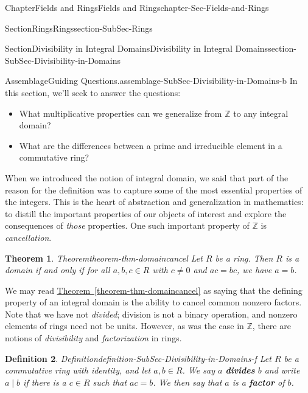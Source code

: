 \documentclass[oneside,10pt,]{book}
\newcommand{\xreffont}{\relax}
\newcommand{\terminology}[1]{\textbf{#1}}
\numberwithin{equation}{section}
\def\Z{{\mathbb Z}}
\newtheorem{theorem}{Theorem}[section]
\newtheorem{definition}[theorem]{Definition}
\begin{document}
\begin{chapterptx}{Chapter}{Fields and Rings}{}{Fields and Rings}{}{}{chapter-Sec-Fields-and-Rings}
\begin{sectionptx}{Section}{Rings}{}{Rings}{}{}{section-SubSec-Rings}
\end{sectionptx}
%
%
\typeout{************************************************}
\typeout{************************************************}
%
\begin{sectionptx}{Section}{Divisibility in Integral Domains}{}{Divisibility in Integral Domains}{}{}{section-SubSec-Divisibility-in-Domains}
\begin{assemblage}{Assemblage}{Guiding Questions.}{assemblage-SubSec-Divisibility-in-Domains-b}%
In this section, we'll seek to answer the questions: %
\begin{itemize}[label=\textbullet]
\item{}What multiplicative properties can we generalize from \(\Z\) to any integral domain?%
\item{}What are the differences between a prime and irreducible element in a commutative ring?%
\end{itemize}
%
\end{assemblage}
When we introduced the notion of integral domain, we said that part of the reason for the definition was to capture some of the most essential properties of the integers. This is the heart of abstraction and generalization in mathematics: to distill the important properties of our objects of interest and explore the consequences of \emph{those} properties. One such important property of \(\Z\) is \emph{cancellation}.%
\begin{theorem}{Theorem}{}{}{theorem-thm-domaincancel}%
Let \(R\) be a ring. Then \(R\) is a domain if and only if for all \(a,b,c\in R\) with \(c\ne 0\) and \(ac = bc\), we have \(a = b\).%
\end{theorem}
We may read \hyperref[theorem-thm-domaincancel]{Theorem~{\xreffont\ref{theorem-thm-domaincancel}}} as saying that the defining property of an integral domain is the ability to cancel common nonzero factors. Note that we have not \emph{divided}; division is not a binary operation, and nonzero elements of rings need not be units. However, as was the case in \(\Z\), there are notions of \emph{divisibility} and \emph{factorization} in rings.%
\begin{definition}{Definition}{}{definition-SubSec-Divisibility-in-Domains-f}%
%
%
Let \(R\) be a commutative ring with identity, and let \(a,b\in R\). We say \(a\) \terminology{divides} \(b\) and write \(a\mid b\) if there is a \(c\in R\) such that \(ac = b\). We then say that \(a\) is a \terminology{factor} of \(b\).%

\end{definition}
\end{sectionptx}
\end{chapterptx}
\end{document}
